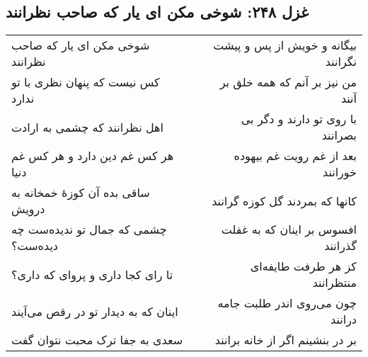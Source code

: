 \begin{center}
\section*{غزل ۲۴۸: شوخی مکن ای یار که صاحب نظرانند}
\label{sec:248}
\begin{longtable}{l p{0.5cm} r}
شوخی مکن ای یار که صاحب نظرانند
&&
بیگانه و خویش از پس و پیشت نگرانند
\\
کس نیست که پنهان نظری با تو ندارد
&&
من نیز بر آنم که همه خلق بر آنند
\\
اهل نظرانند که چشمی به ارادت
&&
با روی تو دارند و دگر بی بصرانند
\\
هر کس غم دین دارد و هر کس غم دنیا
&&
بعد از غم رویت غم بیهوده خورانند
\\
ساقی بده آن کوزهٔ خمخانه به درویش
&&
کانها که بمردند گل کوزه گرانند
\\
چشمی که جمال تو ندیده‌ست چه دیده‌ست؟
&&
افسوس بر اینان که به غفلت گذرانند
\\
تا رای کجا داری و پروای که داری؟
&&
کز هر طرفت طایفه‌ای منتظرانند
\\
اینان که به دیدار تو در رقص می‌آیند
&&
چون می‌روی اندر طلبت جامه درانند
\\
سعدی به جفا ترک محبت نتوان گفت
&&
بر در بنشینم اگر از خانه برانند
\\
\end{longtable}
\end{center}
